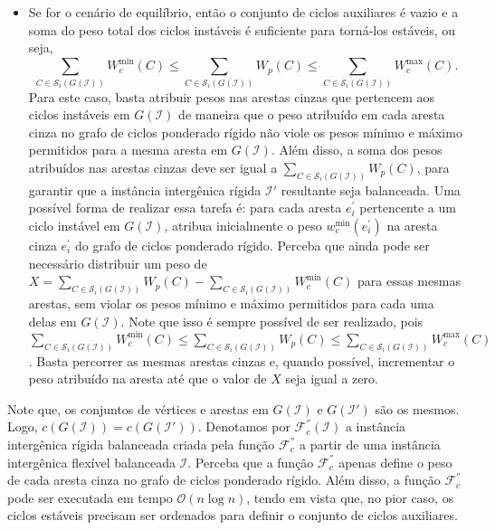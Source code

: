 \begin{itemize}
\begin{itemize}
    \item Se for o cenário de equilíbrio, então o conjunto de ciclos auxiliares é vazio e a soma do peso total dos ciclos instáveis é suficiente para torná-los estáveis, ou seja, $$\sum_{C \in \mathcal{S}_i(G(\mathcal{I}))} W^{\min}_c(C) \le \sum_{C \in \mathcal{S}_i(G(\mathcal{I}))} W_p(C) \le \sum_{C \in \mathcal{S}_i(G(\mathcal{I}))} W^{\max}_c(C).$$ Para este caso, basta atribuir pesos nas arestas cinzas que pertencem aos ciclos instáveis em $G(\mathcal{I})$ de maneira que o peso atribuído em cada aresta cinza no grafo de ciclos ponderado rígido não viole os pesos mínimo e máximo permitidos para a mesma aresta em $G(\mathcal{I})$. Além disso, a soma dos pesos atribuídos nas arestas cinzas deve ser igual a $\sum_{C \in \mathcal{S}_i(G(\mathcal{I}))} W_p(C)$, para garantir que a instância intergênica rígida $\mathcal{I}'$ resultante seja balanceada. Uma possível forma de realizar essa tarefa é: para cada aresta $e^{\prime}_i$ pertencente a um ciclo instável em $G(\mathcal{I})$, atribua inicialmente o peso $w^{\min}_c(e^{\prime}_i)$ na aresta cinza $e^{\prime}_i$ do grafo de ciclos ponderado rígido. Perceba que ainda pode ser necessário distribuir um peso de $X = \sum_{C \in \mathcal{S}_i(G(\mathcal{I}))} W_p(C) - \sum_{C \in \mathcal{S}_i(G(\mathcal{I}))} W^{\min}_c(C)$ para essas mesmas arestas, sem violar os pesos mínimo e máximo permitidos para cada uma delas em $G(\mathcal{I})$. Note que isso é sempre possível de ser realizado, pois $\sum_{C \in \mathcal{S}_i(G(\mathcal{I}))} W^{\min}_c(C) \le \sum_{C \in \mathcal{S}_i(G(\mathcal{I}))} W_p(C) \le \sum_{C \in \mathcal{S}_i(G(\mathcal{I}))} W^{\max}_c(C)$. Basta percorrer as mesmas arestas cinzas e, quando possível, incrementar o peso atribuído na aresta até que o valor de $X$ seja igual a zero.
  \end{itemize}
\end{itemize}

Note que, os conjuntos de vértices e arestas em $G(\mathcal{I})$ e $G(\mathcal{I}')$ são os mesmos. Logo, $c(G(\mathcal{I})) = c(G(\mathcal{I}'))$. Denotamos por $\mathcal{F}_{c}^{''}(\mathcal{I})$ a instância intergênica rígida balanceada criada pela função $\mathcal{F}_{c}^{''}$ a partir de uma instância intergênica flexível balanceada $\mathcal{I}$. Perceba que a função $\mathcal{F}_{c}^{''}$ apenas define o peso de cada aresta cinza no grafo de ciclos ponderado rígido. Além disso, a função $\mathcal{F}_{c}^{''}$ pode ser executada em tempo $\mathcal{O}(n \log n)$, tendo em vista que, no pior caso, os ciclos estáveis precisam ser ordenados para definir o conjunto de ciclos auxiliares.

